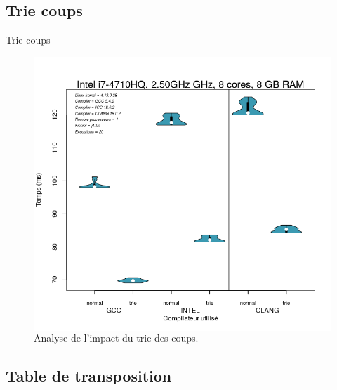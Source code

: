 \documentclass{beamer}
\begin{document}
\subsection{Trie coups}

\begin{frame}{Trie coups}
	\begin{figure}
	\begin{columns}
      \caption{Analyse de l'impact du trie des coups.\label{Fig:trie}}
      \includegraphics[width=\textwidth]{trie.png}
    \end{columns}	
	\end{figure}
\end{frame}

\subsection{Table de transposition}
\end{document}
